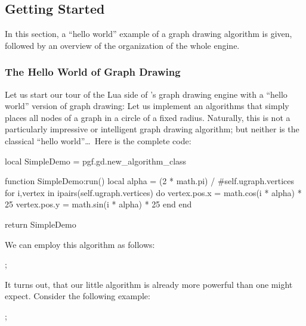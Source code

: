 \subsection{Getting Started}

In this section, a ``hello world'' example of a graph
drawing algorithm  is given, followed by an overview of the
organization of the whole engine.



\subsubsection{The Hello World of Graph Drawing}

Let us start our tour of the Lua side of \tikzname's graph drawing
engine with a ``hello world'' version of graph drawing: Let us
implement an algorithms that simply places all nodes of a graph in a
circle of a fixed radius. Naturally, this is not a particularly
impressive or intelligent graph drawing algorithm; but neither is the
classical ``hello world''\dots\ Here is the complete code:

\begin{codeexample}
local SimpleDemo = pgf.gd.new_algorithm_class {}

function SimpleDemo:run()
  local alpha = (2 * math.pi) / #self.ugraph.vertices
  for i,vertex in ipairs(self.ugraph.vertices) do
    vertex.pos.x = math.cos(i * alpha) * 25
    vertex.pos.y = math.sin(i * alpha) * 25
  end
end

return SimpleDemo  
\end{codeexample}

We can employ this algorithm as follows:

\begin{codeexample}[pre={
    \pgfkeys{
      /graph drawing/radius=25,
      /graph drawing/algorithm/.code={\pgfgdgraphparameter{/graph drawing/algorithm}{"pgf.gd.examples.##1"}}}}]
\tikz [layout=SimpleDemo]
  ;
\end{codeexample}

It turns out, that our little algorithm is already more powerful than
one might expect. Consider the following example:
\begin{codeexample}[pre={
    \pgfkeys{
      /graph drawing/radius=25,
      /graph drawing/algorithm/.code={\pgfgdgraphparameter{/graph drawing/algorithm}{"pgf.gd.examples.##1"}}}}]
\tikz [layout=SimpleDemo, componentwise]
  ;
\end{codeexample}

